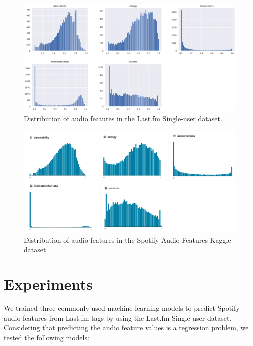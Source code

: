 \documentclass[sn-mathphys]{sn-jnl}%
\theoremstyle{thmstyleone}%
\theoremstyle{thmstyletwo}%
\theoremstyle{thmstylethree}%
\begin{document}
\begin{figure}[h!]
      \centering
      \includegraphics[width=\textwidth]{images/features-distribution.png}
      \caption{Distribution of audio features in the Last.fm Single-user dataset.}
      \label{fig:audio-features-distribution}
\end{figure}

\begin{figure}[h!]
      \centering
      \includegraphics[width=\textwidth]{images/feature-distribution-kaggle.png}
      \caption{Distribution of audio features in the Spotify Audio Features Kaggle dataset.}
      \label{fig:audio-features-distribution-kaggle}
\end{figure}




\section{Experiments}\label{sec5}

We trained three commonly used machine learning models to predict Spotify audio features from Last.fm tags by using the Last.fm Single-user dataset.
Considering that predicting the audio feature values is a regression problem, we tested the following models:
\end{document}
